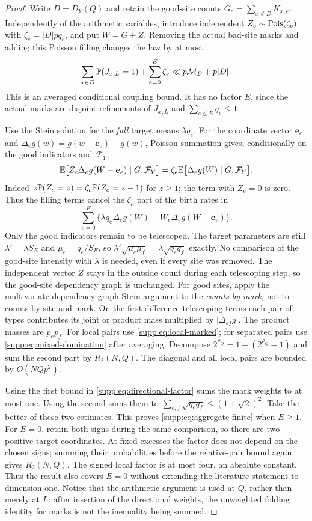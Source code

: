 \begin{proof}
Write $D=D_Y(Q)$ and retain the good-site counts
$G_e=\sum_{x\notin D}K_{x,e}$. Independently of the arithmetic variables,
introduce independent $Z_e\sim\operatorname{Pois}(\zeta_e)$ with
$\zeta_e=|D|pq_e$, and put $W=G+Z$. Removing the actual bad-site marks
and adding this Poisson filling changes the law by at most
\[
 \sum_{x\in D}\mathbb P(J_{x,L}=1)+\sum_{e=0}^E\zeta_e
 \ll p\mathcal M_B+p|D|.
\]
This is an averaged conditional coupling bound. It has no factor $E$,
since the actual marks are disjoint refinements of $J_{x,L}$ and
$\sum_{e\le E}q_e\le1$.

Use the Stein solution for the \emph{full} target means $\lambda q_e$.
For the coordinate vector $\boldsymbol e_e$ and
$\Delta_eg(w)=g(w+\boldsymbol e_e)-g(w)$, Poisson summation gives,
conditionally on the good indicators and $\mathcal F_Y$,
\[
 \mathbb E\bigl[Z_e\Delta_eg(W-\boldsymbol e_e)\mid G,\mathcal F_Y\bigr]
 =\zeta_e\mathbb E\bigl[\Delta_eg(W)\mid G,\mathcal F_Y\bigr].
\]
Indeed $z\mathbb P(Z_e=z)=\zeta_e\mathbb P(Z_e=z-1)$ for $z\ge1$; the term with
$Z_e=0$ is zero. Thus the filling terms cancel the $\zeta_e$ part of the
birth rates in
\[
 \sum_{e=0}^E\{\lambda q_e\Delta_eg(W)
              -W_e\Delta_eg(W-\boldsymbol e_e)\}.
\]
Only the good indicators remain to be telescoped. The target parameters
are still $\lambda'=\lambda S_E$ and $\mu_e=q_e/S_E$, so
$\lambda'\sqrt{\mu_e\mu_f}=\lambda\sqrt{q_eq_f}$ exactly.
No comparison of the good-site intensity with $\lambda$ is needed,
even if every site was removed. The independent vector $Z$ stays in the
outside count during each telescoping step, so the good-site dependency
graph is unchanged. For good sites, apply the multivariate dependency-graph Stein argument
\cite{Barbour1988SteinProcess,Rollin2012SteinFactors} to the \emph{counts by mark}, not to
counts by site and mark. On the first-difference telescoping terms each
pair of types contributes its joint or product mass multiplied by
$|\Delta_{ef}g|$. The product masses are $p_ep_f$.
For local pairs use \eqref{supp:eq:local-marked}; for separated pairs use
\eqref{supp:eq:mixed-domination} after averaging. Decompose
$2^{\rho_Q}=1+(2^{\rho_Q}-1)$ and sum the second part by $R_2(N,Q)$.
The diagonal and all local pairs are bounded by $O(NQp^2)$.

Using the first bound in \eqref{supp:eq:directional-factor} sums the mark
weights to at most one. Using the second sums them to
$\sum_{e,f}\sqrt{q_eq_f}\le(1+\sqrt2)^2$. Take the better of these two estimates. This proves \eqref{supp:eq:aggregate-finite}
when $E\ge1$. For $E=0$, retain both signs during the same comparison,
so there are two positive target coordinates. At fixed excesses the
factor does not depend on the chosen signs; summing their probabilities
before the relative-pair bound again gives $R_2(N,Q)$.
The signed local factor is at most four, an absolute constant.
Thus the result also covers $E=0$ without extending the literature
statement to dimension one.
Notice that the arithmetic argument is used at $Q$, rather than merely
at $L$: after insertion of the directional weights, the unweighted
folding identity for marks is not the inequality being summed.
\end{proof}

